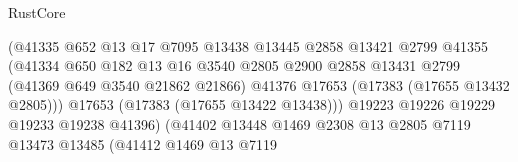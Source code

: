 \begin{lexlean}{RustCore}
\begin{coremodule}
                                              (@41335
                                                @652
                                                @13
                                                @17
                                                @7095
                                                @13438
                                                @13445
                                                @2858
                                                @13421
                                                @2799
                                                @41355
                                                (@41334
                                                  @650
                                                  @182
                                                  @13
                                                  @16
                                                  @3540
                                                  @2805
                                                  @2900
                                                  @2858
                                                  @13431
                                                  @2799
                                                  (@41369 @649 @3540 @21862 @21866)
                                                  @41376
                                                  @17653
                                                  (@17383 (@17655 @13432 @2805)))
                                                @17653
                                                (@17383 (@17655 @13422 @13438)))
                                              @19223
                                              @19226
                                              @19229
                                              @19233
                                              @19238
                                              @41396)
                                            (@41402
                                              @13448
                                              @1469
                                              @2308
                                              @13
                                              @2805
                                              @7119
                                              @13473
                                              @13485
                                              (@41412
                                                @1469
                                                @13
                                                @7119

\end{coremodule}
\end{lexlean}
